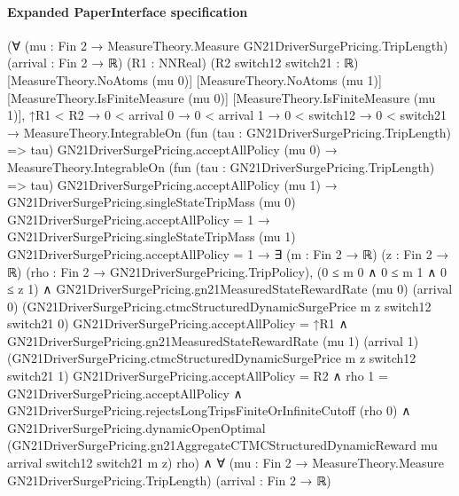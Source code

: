 \documentclass[10pt]{article}
\begin{document}
\paragraph{Expanded PaperInterface specification}
\begin{ReviewVerbatim}
(∀ (mu : Fin 2 → MeasureTheory.Measure GN21DriverSurgePricing.TripLength) (arrival : Fin 2 → ℝ) (R1 : NNReal)
    (R2 switch12 switch21 : ℝ) [MeasureTheory.NoAtoms (mu 0)] [MeasureTheory.NoAtoms (mu 1)]
    [MeasureTheory.IsFiniteMeasure (mu 0)] [MeasureTheory.IsFiniteMeasure (mu 1)],
    ↑R1 < R2 →
      0 < arrival 0 →
        0 < arrival 1 →
          0 < switch12 →
            0 < switch21 →
              MeasureTheory.IntegrableOn (fun (tau : GN21DriverSurgePricing.TripLength) => tau)
                  GN21DriverSurgePricing.acceptAllPolicy (mu 0) →
                MeasureTheory.IntegrableOn (fun (tau : GN21DriverSurgePricing.TripLength) => tau)
                    GN21DriverSurgePricing.acceptAllPolicy (mu 1) →
                  GN21DriverSurgePricing.singleStateTripMass (mu 0) GN21DriverSurgePricing.acceptAllPolicy = 1 →
                    GN21DriverSurgePricing.singleStateTripMass (mu 1) GN21DriverSurgePricing.acceptAllPolicy = 1 →
                      ∃ (m : Fin 2 → ℝ) (z : Fin 2 → ℝ) (rho : Fin 2 → GN21DriverSurgePricing.TripPolicy),
                        (0 ≤ m 0 ∧ 0 ≤ m 1 ∧ 0 ≤ z 1) ∧
                          GN21DriverSurgePricing.gn21MeasuredStateRewardRate (mu 0) (arrival 0)
                                (GN21DriverSurgePricing.ctmcStructuredDynamicSurgePrice m z switch12 switch21 0)
                                GN21DriverSurgePricing.acceptAllPolicy =
                              ↑R1 ∧
                            GN21DriverSurgePricing.gn21MeasuredStateRewardRate (mu 1) (arrival 1)
                                  (GN21DriverSurgePricing.ctmcStructuredDynamicSurgePrice m z switch12 switch21 1)
                                  GN21DriverSurgePricing.acceptAllPolicy =
                                R2 ∧
                              rho 1 = GN21DriverSurgePricing.acceptAllPolicy ∧
                                GN21DriverSurgePricing.rejectsLongTripsFiniteOrInfiniteCutoff (rho 0) ∧
                                  GN21DriverSurgePricing.dynamicOpenOptimal
                                    (GN21DriverSurgePricing.gn21AggregateCTMCStructuredDynamicReward mu arrival switch12
                                      switch21 m z)
                                    rho) ∧
  ∀ (mu : Fin 2 → MeasureTheory.Measure GN21DriverSurgePricing.TripLength) (arrival : Fin 2 → ℝ)

\end{ReviewVerbatim}
\end{document}
